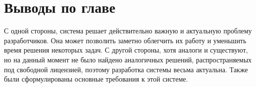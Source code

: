 \section{Выводы по главе}

С одной стороны, система решает действительно важную и актуальную проблему разработчиков. Она может позволить заметно облегчить их работу и уменьшить время решения некоторых задач. С другой стороны, хотя аналоги и существуют, но на данный момент не было найдено аналогичных решений, распространяемых под свободной лицензией, поэтому разработка системы весьма актуальна. Также были сформулированы основные требования к этой системе.

\clearpage